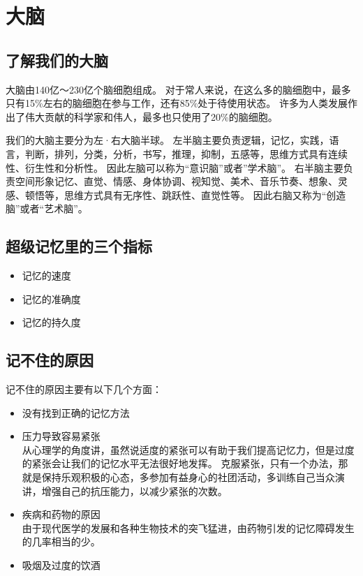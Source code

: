 
\chapter{大脑}

\section{了解我们的大脑}

大脑由140亿～230亿个脑细胞组成。
对于常人来说，在这么多的脑细胞中，最多只有15\%左右的脑细胞在参与工作，还有85\%处于待使用状态。
许多为人类发展作出了伟大贡献的科学家和伟人，最多也只使用了20\%的脑细胞。

我们的大脑主要分为左·右大脑半球。
左半脑主要负责逻辑，记忆，实践，语言，判断，排列，分类，分析，书写，推理，抑制，五感等，思维方式具有连续性、衍生性和分析性。
因此左脑可以称为“意识脑”或者”学术脑”。
右半脑主要负责空间形象记忆、直觉、情感、身体协调、视知觉、美术、音乐节奏、想象、灵感、顿悟等，思维方式具有无序性、跳跃性、直觉性等。
因此右脑又称为“创造脑”或者“艺术脑”。


\section{超级记忆里的三个指标}

\begin{itemize}
\item 记忆的速度
\item 记忆的准确度
\item 记忆的持久度
\end{itemize}


\section{记不住的原因}

记不住的原因主要有以下几个方面：
\begin{itemize}
\item 没有找到正确的记忆方法
\item 压力导致容易紧张\\
  从心理学的角度讲，虽然说适度的紧张可以有助于我们提高记忆力，但是过度的紧张会让我们的记忆水平无法很好地发挥。
  克服紧张，只有一个办法，那就是保持乐观积极的心态，多参加有益身心的社团活动，多训练自己当众演讲，增强自己的抗压能力，以减少紧张的次数。
\item 疾病和药物的原因\\
  由于现代医学的发展和各种生物技术的突飞猛进，由药物引发的记忆障碍发生的几率相当的少。
\item 吸烟及过度的饮酒
\end{itemize}



